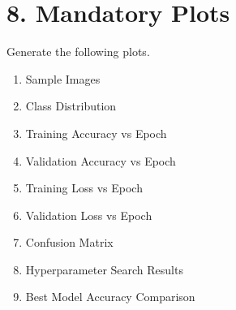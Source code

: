 \documentclass[11pt]{article}
\begin{document}
\section*{8. Mandatory Plots}

Generate the following plots.

\begin{enumerate}
\item Sample Images
\item Class Distribution
\item Training Accuracy vs Epoch
\item Validation Accuracy vs Epoch
\item Training Loss vs Epoch
\item Validation Loss vs Epoch
\item Confusion Matrix
\item Hyperparameter Search Results
\item Best Model Accuracy Comparison
\end{enumerate}
\end{document}
